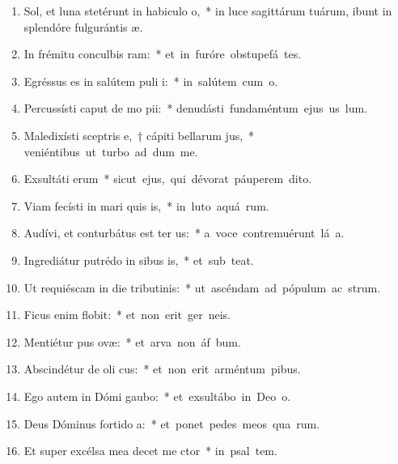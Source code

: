 \begin{flushleft}
\begin{enumerate}[leftmargin=*]
\item Sol, et luna stetérunt in habiculo o,~* in luce sagittárum tuárum, ibunt in splendóre fulgurántis  æ.
\item In frémitu conculbis ram:~* \mbox{et in furóre obstupefá tes.}
\item Egréssus es in salútem puli i:~* \mbox{in salútem cum  o.}
\item Percussísti caput de mo pii:~* \mbox{denudásti fundaméntum ejus us  lum.}
\item Maledixísti sceptris e,~† cápiti bellarum jus,~* \mbox{veniéntibus ut turbo ad dum me.}
\item Exsultáti erum~* \mbox{sicut ejus, qui dévorat páuperem  dito.}
\item Viam fecísti in mari quis is,~* \mbox{in luto aquá rum.}
\item Audívi, et conturbátus est ter us:~* \mbox{a voce contremuérunt lá a.}
\item Ingrediátur putrédo in sibus is,~* \mbox{et sub  teat.}
\item Ut requiéscam in die tributinis:~* \mbox{ut ascéndam ad pópulum ac strum.}
\item Ficus enim  flobit:~* \mbox{et non erit ger  neis.}
\item Mentiétur pus ovæ:~* \mbox{et arva non áf bum.}
\item Abscindétur de oli cus:~* \mbox{et non erit arméntum  pibus.}
\item Ego autem in Dómi gaubo:~* \mbox{et exsultábo in Deo  o.}
\item Deus Dóminus fortido a:~* \mbox{et ponet pedes meos qua rum.}
\item Et super excélsa mea decet me ctor~* \mbox{in psal tem.}

\end{enumerate}
\end{flushleft}

